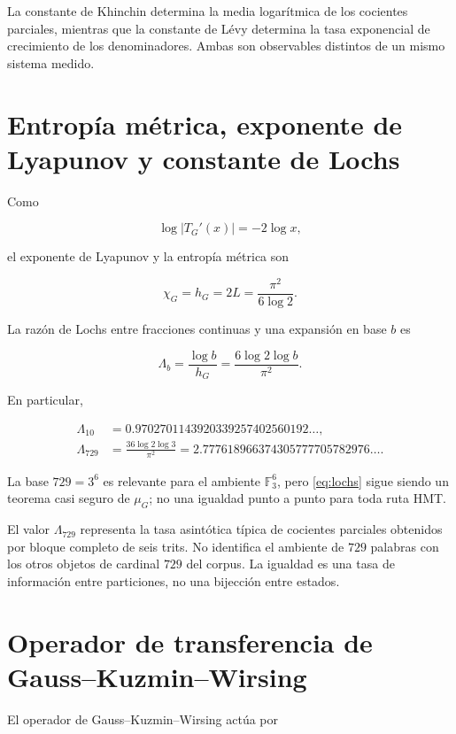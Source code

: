 La constante de Khinchin determina la media logar\'itmica de los cocientes
parciales, mientras que la constante de L\'evy determina la tasa exponencial
de crecimiento de los denominadores. Ambas son observables distintos de un
mismo sistema medido.

\section{Entrop\'ia m\'etrica, exponente de Lyapunov y constante de Lochs}

Como

\[
\log|T_G'(x)|=-2\log x,
\]

el exponente de Lyapunov y la entrop\'ia m\'etrica son

\begin{equation}
\chi_G=h_G=2L=\frac{\pi^2}{6\log2}.
\label{eq:gauss-entropy}
\end{equation}

La raz\'on de Lochs entre fracciones continuas y una expansi\'on en base \(b\) es

\begin{equation}
\Lambda_b=\frac{\log b}{h_G}
=\frac{6\log2\log b}{\pi^2}.
\label{eq:lochs}
\end{equation}

En particular,

\begin{align*}
\Lambda_{10}&=0.9702701143920339257402560192\ldots,\\
\Lambda_{729}&=\frac{36\log2\log3}{\pi^2}
=2.777618966374305777705782976\ldots.
\end{align*}

La base \(729=3^6\) es relevante para el ambiente \(\mathbb F_3^6\), pero \cref{eq:lochs} sigue siendo un teorema casi seguro de \(\mu_G\); no una igualdad punto a punto para toda ruta HMT.

El valor \(\Lambda_{729}\) representa la tasa asint\'otica t\'ipica de
cocientes parciales obtenidos por bloque completo de seis trits. No identifica el
ambiente de \(729\) palabras con los otros objetos de cardinal \(729\) del
corpus. La igualdad es una tasa de informaci\'on entre particiones, no una
bijecci\'on entre estados.

\section{Operador de transferencia de Gauss--Kuzmin--Wirsing}

El operador de Gauss--Kuzmin--Wirsing act\'ua por

